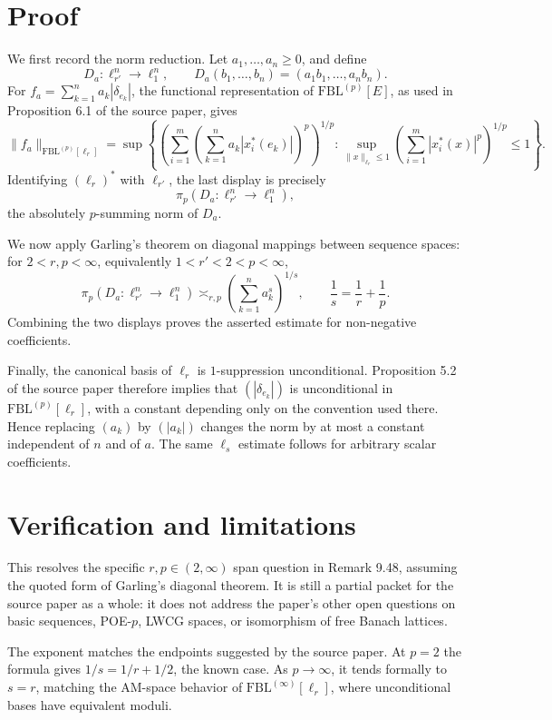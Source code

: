 \documentclass[11pt]{article}
\newcommand{\FBL}{\mathrm{FBL}}
\begin{document}
\section*{Proof}

We first record the norm reduction.  Let \(a_1,\dots,a_n\geq0\), and define
\[
  D_a:\ell_{r'}^n\longrightarrow \ell_1^n,\qquad
  D_a(b_1,\dots,b_n)=(a_1b_1,\dots,a_nb_n).
\]
For \(f_a=\sum_{k=1}^n a_k|\delta_{e_k}|\), the functional representation
of \(\FBL^{(p)}[E]\), as used in Proposition 6.1 of the source paper, gives
\[
 \|f_a\|_{\FBL^{(p)}[\ell_r]}
 =
 \sup
 \left\{
 \left(\sum_{i=1}^m
       \left(\sum_{k=1}^n a_k |x_i^*(e_k)|\right)^p
 \right)^{1/p}
 :
 \sup_{\|x\|_{\ell_r}\leq 1}
 \left(\sum_{i=1}^m |x_i^*(x)|^p\right)^{1/p}\leq1
 \right\}.
\]
Identifying \((\ell_r)^*\) with \(\ell_{r'}\), the last display is precisely
\[
  \pi_p(D_a:\ell_{r'}^n\to\ell_1^n),
\]
the absolutely \(p\)-summing norm of \(D_a\).

We now apply Garling's theorem on diagonal mappings between sequence spaces:
for \(2<r,p<\infty\), equivalently \(1<r'<2<p<\infty\),
\[
  \pi_p(D_a:\ell_{r'}^n\to\ell_1^n)
  \asymp_{r,p}
  \left(\sum_{k=1}^n a_k^s\right)^{1/s},
  \qquad
  \frac1s=\frac1r+\frac1p.
\]
Combining the two displays proves the asserted estimate for non-negative
coefficients.

Finally, the canonical basis of \(\ell_r\) is \(1\)-suppression
unconditional.  Proposition 5.2 of the source paper therefore implies that
\((|\delta_{e_k}|)\) is unconditional in \(\FBL^{(p)}[\ell_r]\), with a
constant depending only on the convention used there.  Hence replacing
\((a_k)\) by \((|a_k|)\) changes the norm by at most a constant independent
of \(n\) and of \(a\).  The same \(\ell_s\) estimate follows for arbitrary
scalar coefficients.

\section*{Verification and limitations}

This resolves the specific \(r,p\in(2,\infty)\) span question in Remark
9.48, assuming the quoted form of Garling's diagonal theorem.  It is still a
partial packet for the source paper as a whole: it does not address the
paper's other open questions on basic sequences, POE-\(p\), LWCG spaces, or
isomorphism of free Banach lattices.

The exponent matches the endpoints suggested by the source paper.  At
\(p=2\) the formula gives \(1/s=1/r+1/2\), the known case.  As
\(p\to\infty\), it tends formally to \(s=r\), matching the AM-space behavior
of \(\FBL^{(\infty)}[\ell_r]\), where unconditional bases have equivalent
moduli.
\end{document}
